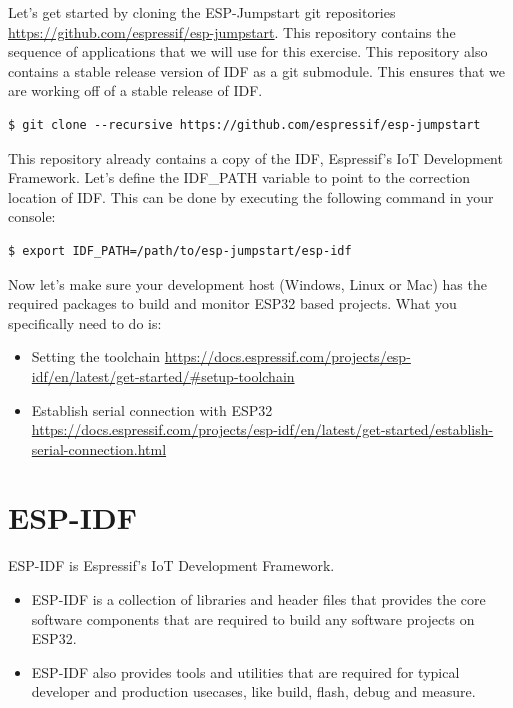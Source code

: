 \documentclass[main.tex]{subfiles}
\begin{document}
Let's get started by cloning the ESP-Jumpstart git repositories \url{https://github.com/espressif/esp-jumpstart}. This repository contains the sequence of applications that we will use for this exercise. This repository also contains a stable release version of IDF as a git submodule. This ensures that we are working off of a stable release of IDF.

\begin{verbatim}
$ git clone --recursive https://github.com/espressif/esp-jumpstart
\end{verbatim}

This repository already contains a copy of the IDF, Espressif's IoT Development Framework. Let's define the IDF\_PATH variable to point to the correction location of IDF. This can be done by executing the following command in your console:

\begin{verbatim}
$ export IDF_PATH=/path/to/esp-jumpstart/esp-idf
\end{verbatim}

Now let's make sure your development host (Windows, Linux or Mac) has the required packages to build and monitor ESP32 based projects. What you specifically need to do is:
\begin{itemize}
    \item Setting the toolchain \url{https://docs.espressif.com/projects/esp-idf/en/latest/get-started/#setup-toolchain}
    \item Establish serial connection with ESP32 \url{https://docs.espressif.com/projects/esp-idf/en/latest/get-started/establish-serial-connection.html}
\end{itemize}

\section{ESP-IDF}

ESP-IDF is Espressif's IoT Development Framework. 
\begin{itemize}
    \item ESP-IDF is a collection of libraries and header files that provides the core software components that are required to build any software projects on ESP32. 
    \item ESP-IDF also provides tools and utilities that are required for typical developer and production usecases, like build, flash, debug and measure.
\end{itemize}
\end{document}
